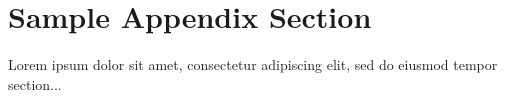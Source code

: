 \documentclass[preprint,12pt,authoryear]{elsarticle}
\begin{document}
\section{Sample Appendix Section}
\label{sec:sample:appendix}
Lorem ipsum dolor sit amet, consectetur adipiscing elit, sed do eiusmod tempor section...

 






\end{document}
